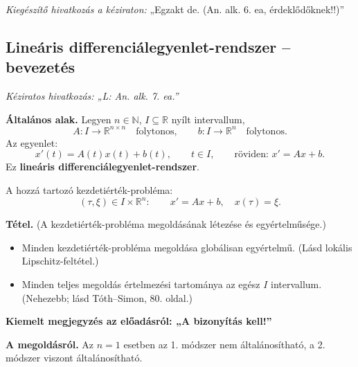 \textit{Kiegészítő hivatkozás a kéziraton:}
„Egzakt de. (An. alk. 6. ea, érdeklődőknek!!)”

\subsection{Lineáris differenciálegyenlet-rendszer -- bevezetés}
\textit{Kéziratos hivatkozás: „L: An. alk. 7. ea.”}

\textbf{Általános alak.}
Legyen $n\in\mathbb N$, $I\subseteq\mathbb R$ nyílt intervallum,
\[
 A:I\longrightarrow\mathbb R^{n\times n}
 \quad\text{folytonos},\qquad
 b:I\longrightarrow\mathbb R^n
 \quad\text{folytonos}.
\]
Az egyenlet:
\[
 x'(t)=A(t)x(t)+b(t),\qquad t\in I,
 \qquad\text{röviden: }x'=Ax+b.
\]
Ez \textbf{lineáris differenciálegyenlet-rendszer}.

A hozzá tartozó kezdetiérték-probléma:
\[
 (\tau,\xi)\in I\times\mathbb R^n:
 \qquad x'=Ax+b,\quad x(\tau)=\xi.
\]

\begin{matbox}
\textbf{Tétel.} (A kezdetiérték-probléma megoldásának
létezése és egyértelműsége.)
\begin{itemize}
 \item Minden kezdetiérték-probléma megoldása globálisan egyértelmű.
       (Lásd lokális Lipschitz-feltétel.)
 \item Minden teljes megoldás értelmezési tartománya
       az egész $I$ intervallum.
       (Nehezebb; lásd Tóth--Simon, 80. oldal.)
\end{itemize}
\end{matbox}

\textbf{Kiemelt megjegyzés az előadásról: „A bizonyítás kell!”}

\textbf{A megoldásról.}
Az $n=1$ esetben az 1. módszer nem általánosítható,
a 2. módszer viszont általánosítható.
